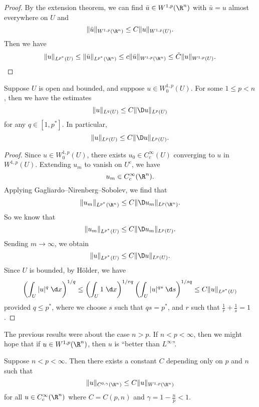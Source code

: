 \documentclass[a4paper]{article}
\begin{document}
\begin{proof}
  By the extension theorem, we can find $\bar{u} \in W^{1, p}(\R^n)$ with $\bar{u} = u$ almost everywhere on $U$ and
  \[
    \|\bar{u}\|_{W^{1, p}(\R^n)} \leq C \|u\|_{W^{1, p}(U)}.
  \]
  Then we have
  \[
    \|u\|_{L^{p^*}(U)} \leq \|\bar{u}\|_{L^{p^*}(\R^n)} \leq c \|\bar{u}\|_{W^{1, p}(\R^n)} \leq \tilde{C} \|u\|_{W^{1, p}(U)}.\qedhere
  \]
\end{proof}

\begin{cor}
  Suppose $U$ is open and bounded, and suppose $u \in W^{1, p}_0(U)$. For some $1 \leq p < n$, then we have the estimates
  \[
    \|u\|_{L^q(U)} \leq C \|\D u\|_{L^p(U)}
  \]
  for any $q \in [1, p^*]$. In particular,
  \[
    \|u\|_{L^p(U)} \leq C \|\D u\|_{L^p(U)}.
  \]
\end{cor}

\begin{proof}
  Since $u \in W_0^{1, p}(U)$, there exists $u_0 \in C_c^\infty (U)$ converging to $u$ in $W^{1, p}(U)$. Extending $u_m$ to vanish on $U^c$, we have
  \[
    u_m \in C_c^\infty(\R^n).
  \]
  Applying Gagliardo--Nirenberg--Sobolev, we find that
  \[
    \|u_m\|_{L^{p^*}(\R^n)} \leq C \|\D u_m\|_{L^p(\R^n)}.
  \]
  So we know that
  \[
    \|u_m\|_{L^{p^*}(U)} \leq C \|\D u_m\|_{L^p(U)}.
  \]
  Sending $m \to \infty$, we obtain
  \[
    \|u\|_{L^{p^*}(U)} \leq C \|\D u\|_{L^p(U)}.
  \]
  Since $U$ is bounded, by H\"older, we have
  \[
    \left(\int_U |u|^q\;\d x\right)^{1/q} \leq \left(\int_U 1 \;\d x \right)^{1/rq} \left(\int_U |u|^{qs}\;\d s \right)^{1/sq} \leq C \|u\|_{L^{p^*}(U)}
  \]
  provided $q \leq p^*$, where we choose $s$ such that $qs = p^*$, and $r$ such that $\frac{1}{r} + \frac{1}{s} = 1$.
\end{proof}

The previous results were about the case $n > p$. If $n < p < \infty$, then we might hope that if $u \in W^{1, p}(\R^n)$, then $u$ is ``better than $L^\infty$''.

\begin{thm}
  Suppose $n < p < \infty$. Then there exists a constant $C$ depending only on $p$ and $n$ such that
  \[
    \|u\|_{C^{0, \gamma}(\R^n)} \leq C \|u\|_{W^{1, p}(\R^n)}
  \]
  for all $u \in C^\infty_c (\R^n)$ where $C = C(p, n)$ and $\gamma = 1 - \frac{n}{p} < 1$.
\end{thm}
\end{document}
